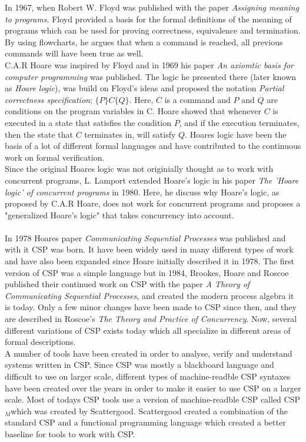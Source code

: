 \documentclass[a4paper]{report}
\newcommand{\cspm}{CSP$_M$}
\begin{document}
In 1967, when Robert W. Floyd was published with the paper \textit{Assigning meaning to programs}\cite{Floyd1967}. Floyd provided a basis for the formal definitions of the meaning of programs which can be used for proving correctness, equivalence and termination. By using flowcharts, he argues that when a command is reached, all previous commands will have been true as well.\\ C.A.R Hoare was inspired by Floyd and in 1969 his paper \textit{An axiomtic basis for computer programming}\cite{Hoare1969} was published. The logic he presented there (later known as \textit{Hoare logic}), was build on Floyd's ideas and proposed the notation \textit{Partial correctness specification}; $\{P\} C \{Q\}$. Here, $C$ is a command and $P$ and $Q$ are conditions on the program variables in C. Hoare showed that whenever $C$ is executed in a state that satisfies the condition $P$, and if the execution terminates, then the state that $C$ terminates in, will satisfy $Q$. Hoares logic have been the basis of a lot of different formal languages and have contributed to the continuous work on formal verification. \\
Since the original Hoares logic was not originially thought as to work with concurrent programs, L. Lamport extended Hoare's logic in his paper \textit{The 'Hoare logic' of concurrent programs}\cite{Lamport1980} in 1980. Here, he discuss why Hoare's logic, as proposed by C.A.R Hoare, does not work for concurrent programs and proposes a "generalized Hoare's logic" that takes concurrency into account. \\\\
In 1978 Hoares paper \textit{Communicating Sequential Processes} was published and with it CSP was born. It have been widely used in many different types of work and have also been expanded since Hoare initially described it in 1978\cite{Abdallah2005}. The first version of CSP was a simple language but in 1984, Brookes, Hoare and Roscoe published their continued work on CSP with the paper \textit{A Theory of Communicating Sequential Processes}\cite{Brookes1984}, and created the modern process algebra it is today. Only a few minor changes have been made to CSP since then, and they are described in Roscoe's \textit{The Theory and Practice of Concurrency}\cite{Roscoe1997}. Now, several different variations of CSP exists today which all specialize in different areas of formal descriptions.\\
A number of tools have been created in order to analyse, verify and understand systems written in CSP. Since CSP was mostly a blackboard language and difficult to use on larger scale, different types of machine-readble CSP syntaxes have been created over the years in order to make it easier to use CSP on a larger scale. Most of todays CSP tools use a version of machine-readble CSP called \cspm which was created by Scattergood\cite{Scattergood1998}. Scattergood created a combination of the standard CSP and a functional programming language which created a better baseline for tools to work with CSP.\\ 
\end{document}
